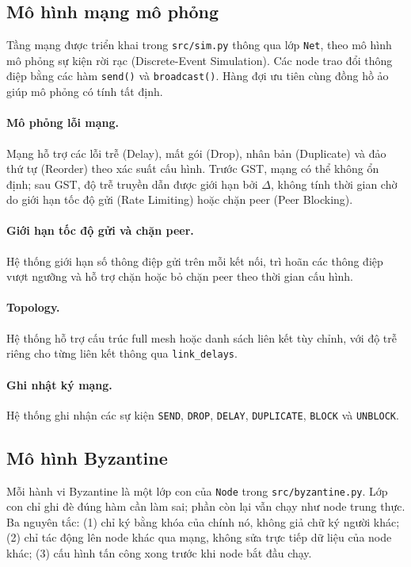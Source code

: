 \subsection{Mô hình mạng mô phỏng}
Tầng mạng được triển khai trong \texttt{src/sim.py} thông qua lớp \texttt{Net}, theo mô hình mô phỏng sự kiện rời rạc (Discrete-Event Simulation). Các node trao đổi thông điệp bằng các hàm \texttt{send()} và \texttt{broadcast()}. Hàng đợi ưu tiên cùng đồng hồ ảo giúp mô phỏng có tính tất định.

\paragraph{Mô phỏng lỗi mạng.} Mạng hỗ trợ các lỗi trễ (Delay), mất gói (Drop), nhân bản (Duplicate) và đảo thứ tự (Reorder) theo xác suất cấu hình. Trước GST, mạng có thể không ổn định; sau GST, độ trễ truyền dẫn được giới hạn bởi $\Delta$, không tính thời gian chờ do giới hạn tốc độ gửi (Rate Limiting) hoặc chặn peer (Peer Blocking).

\paragraph{Giới hạn tốc độ gửi và chặn peer.} Hệ thống giới hạn số thông điệp gửi trên mỗi kết nối, trì hoãn các thông điệp vượt ngưỡng và hỗ trợ chặn hoặc bỏ chặn peer theo thời gian cấu hình.

\paragraph{Topology.} Hệ thống hỗ trợ cấu trúc full mesh hoặc danh sách liên kết tùy chỉnh, với độ trễ riêng cho từng liên kết thông qua \texttt{link\_delays}.

\paragraph{Ghi nhật ký mạng.} Hệ thống ghi nhận các sự kiện \texttt{SEND}, \texttt{DROP}, \texttt{DELAY}, \texttt{DUPLICATE}, \texttt{BLOCK} và \texttt{UNBLOCK}.
\subsection{Mô hình Byzantine}
\label{sec:byzantine-model}

Mỗi hành vi Byzantine là một lớp con của \texttt{Node} trong \texttt{src/byzantine.py}. Lớp con chỉ ghi đè đúng hàm cần làm sai; phần còn lại vẫn chạy như node trung thực. Ba nguyên tắc: (1) chỉ ký bằng khóa của chính nó, không giả chữ ký người khác; (2) chỉ tác động lên node khác qua mạng, không sửa trực tiếp dữ liệu của node khác; (3) cấu hình tấn công xong trước khi node bắt đầu chạy.

